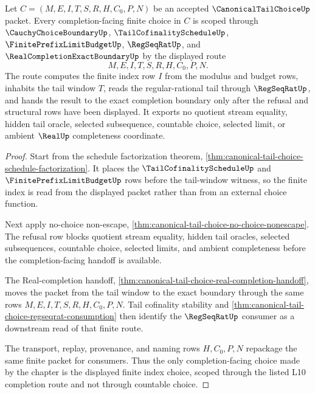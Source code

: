 \begin{theorem}
\label{thm:canonical-tail-choice-scoped-finite-choice-route}
Let $C=(M,E,I,T,S,R,H,C_0,P,N)$ be an accepted
$\CanonicalTailChoiceUp$ packet. Every completion-facing finite choice in $C$
is scoped through $\CauchyChoiceBoundaryUp$, $\TailCofinalityScheduleUp$,
$\FinitePrefixLimitBudgetUp$, $\RegSeqRatUp$, and
$\RealCompletionExactBoundaryUp$ by the displayed route
$$
M,E,I,T,S,R,H,C_0,P,N.
$$
The route computes the finite index row $I$ from the modulus and budget rows,
inhabits the tail window $T$, reads the regular-rational tail through
$\RegSeqRatUp$, and hands the result to the exact completion boundary only
after the refusal and structural rows have been displayed. It exports no
quotient stream equality, hidden tail oracle, selected subsequence, countable
choice, selected limit, or ambient $\RealUp$ completeness coordinate.
\end{theorem}
\begin{proof}
Start from the schedule factorization theorem,
\autoref{thm:canonical-tail-choice-schedule-factorization}. It places the
$\TailCofinalityScheduleUp$ and $\FinitePrefixLimitBudgetUp$ rows before the
tail-window witness, so the finite index is read from the displayed packet
rather than from an external choice function.

Next apply no-choice non-escape,
\autoref{thm:canonical-tail-choice-no-choice-nonescape}. The refusal row
blocks quotient stream equality, hidden tail oracles, selected subsequences,
countable choice, selected limits, and ambient completeness before the
completion-facing handoff is available.

The Real-completion handoff,
\autoref{thm:canonical-tail-choice-real-completion-handoff}, moves the packet
from the tail window to the exact boundary through the same rows
$M,E,I,T,S,R,H,C_0,P,N$. Tail cofinality stability and
\autoref{thm:canonical-tail-choice-regseqrat-consumption} then identify the
$\RegSeqRatUp$ consumer as a downstream read of that finite route.

The transport, replay, provenance, and naming rows $H,C_0,P,N$ repackage the
same finite packet for consumers. Thus the only completion-facing choice made
by the chapter is the displayed finite index choice, scoped through the listed
L10 completion route and not through countable choice.
\end{proof}

